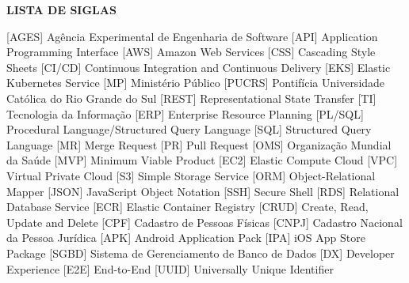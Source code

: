 
\begin{center}
  \uppercase{\bfseries lista de siglas}\\[3em]
\end{center}

\begin{acronym}[XXXXXXXX]
   [AGES] {Agência Experimental de Engenharia de Software}
   [API] {Application Programming Interface}
   [AWS] {Amazon Web Services}
   [CSS] {Cascading Style Sheets}
   [CI/CD] {Continuous Integration and Continuous Delivery}
   [EKS] {Elastic Kubernetes Service}
   [MP] {Ministério Público}
   [PUCRS] {Pontifícia Universidade Católica do Rio Grande do Sul}
   [REST] {Representational State Transfer}
   [TI] {Tecnologia da Informação}
   [ERP] {Enterprise Resource Planning}
   [PL/SQL] {Procedural Language/Structured Query Language}
   [SQL] {Structured Query Language}
   [MR] {Merge Request}
   [PR] {Pull Request}
   [OMS] {Organização Mundial da Saúde}
   [MVP] {Minimum Viable Product}
   [EC2] {Elastic Compute Cloud}
   [VPC] {Virtual Private Cloud}
   [S3] {Simple Storage Service}
   [ORM] {Object-Relational Mapper}
   [JSON] {JavaScript Object Notation}
   [SSH] {Secure Shell}
   [RDS] {Relational Database Service}
   [ECR] {Elastic Container Registry}
   [CRUD] {Create, Read, Update and Delete}
   [CPF] {Cadastro de Pessoas Físicas}
   [CNPJ] {Cadastro Nacional da Pessoa Jurídica}
   [APK] {Android Application Pack}
   [IPA] {iOS App Store Package}
   [SGBD] {Sistema de Gerenciamento de Banco de Dados}
   [DX] {Developer Experience}
   [E2E] {End-to-End}
   [UUID] {Universally Unique Identifier}
\end{acronym}
